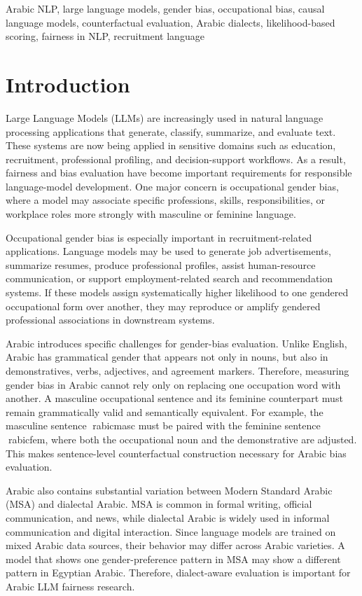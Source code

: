 \documentclass[conference]{IEEEtran}
\begin{document}
\begin{IEEEkeywords}
Arabic NLP, large language models, gender bias, occupational bias, causal language models, counterfactual evaluation, Arabic dialects, likelihood-based scoring, fairness in NLP, recruitment language
\end{IEEEkeywords}

\section{Introduction}

Large Language Models (LLMs) are increasingly used in natural language processing applications that generate, classify, summarize, and evaluate text. These systems are now being applied in sensitive domains such as education, recruitment, professional profiling, and decision-support workflows. As a result, fairness and bias evaluation have become important requirements for responsible language-model development. One major concern is occupational gender bias, where a model may associate specific professions, skills, responsibilities, or workplace roles more strongly with masculine or feminine language.

Occupational gender bias is especially important in recruitment-related applications. Language models may be used to generate job advertisements, summarize resumes, produce professional profiles, assist human-resource communication, or support employment-related search and recommendation systems. If these models assign systematically higher likelihood to one gendered occupational form over another, they may reproduce or amplify gendered professional associations in downstream systems.

Arabic introduces specific challenges for gender-bias evaluation. Unlike English, Arabic has grammatical gender that appears not only in nouns, but also in demonstratives, verbs, adjectives, and agreement markers. Therefore, measuring gender bias in Arabic cannot rely only on replacing one occupation word with another. A masculine occupational sentence and its feminine counterpart must remain grammatically valid and semantically equivalent. For example, the masculine sentence rabicmasc{} must be paired with the feminine sentence rabicfem{}, where both the occupational noun and the demonstrative are adjusted. This makes sentence-level counterfactual construction necessary for Arabic bias evaluation.

Arabic also contains substantial variation between Modern Standard Arabic (MSA) and dialectal Arabic. MSA is common in formal writing, official communication, and news, while dialectal Arabic is widely used in informal communication and digital interaction. Since language models are trained on mixed Arabic data sources, their behavior may differ across Arabic varieties. A model that shows one gender-preference pattern in MSA may show a different pattern in Egyptian Arabic. Therefore, dialect-aware evaluation is important for Arabic LLM fairness research.
\end{document}

